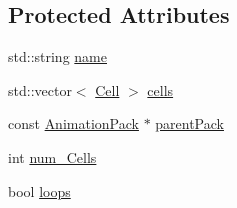 \subsection*{Protected Attributes}
\begin{DoxyCompactItemize}
\item 
std\+::string \hyperlink{classZeta_1_1Animation_ac532add4feb3dd5e33f722a8142aedd6}{name}
\item 
std\+::vector$<$ \hyperlink{classZeta_1_1Cell}{Cell} $>$ \hyperlink{classZeta_1_1Animation_aa31ff21bcccd45e09ad6924087e9c1c7}{cells}
\item 
const \hyperlink{classZeta_1_1AnimationPack}{Animation\+Pack} $\ast$ \hyperlink{classZeta_1_1Animation_a2cbc0d0aac921dbc343ae864af112559}{parent\+Pack}
\item 
int \hyperlink{classZeta_1_1Animation_a6449ef440e5d9ce97187a00d32b637e5}{num\+\_\+\+Cells}
\item 
bool \hyperlink{classZeta_1_1Animation_af3097763657c74004f42843fdd6b577b}{loops}
\end{DoxyCompactItemize}


